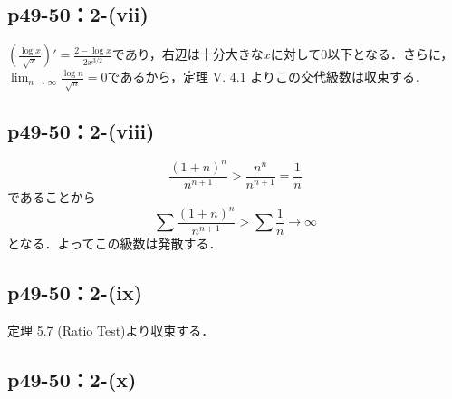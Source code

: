 \documentclass[a4paper,10pt,fleqn]{ltjsarticle}
\begin{document}
    \subsection*{p49-50：2-(vii)}
\begin{screen}
  $\left (\frac{\log x}{\sqrt x}\right)' = \frac{2-\log x}{2x^{3/2}}$であり，右辺は十分大きな$x$に対して$0$以下となる．さらに，$\lim _{n \to \infty} \frac{\log n}{\sqrt n} = 0$であるから，定理 V. 4.1 よりこの交代級数は収束する．
\end{screen}

    \subsection*{p49-50：2-(viii)}

        \begin{screen}
        \[
        \frac{(1+n)^n}{n^{n+1}}>\frac{n^n}{n^{n+1}}=\frac{1}{n}
        \]
        であることから
        \[
        \sum \frac{(1+n)^n}{n^{n+1}}>\sum \frac{1}{n} \rightarrow \infty
        \]
        となる．よってこの級数は発散する．
        \end{screen}
        

        \subsection*{p49-50：2-(ix)}

        \begin{screen}
            定理 5.7 (Ratio Test)より収束する．
        \end{screen}

        \subsection*{p49-50：2-(x)}
\end{document}
